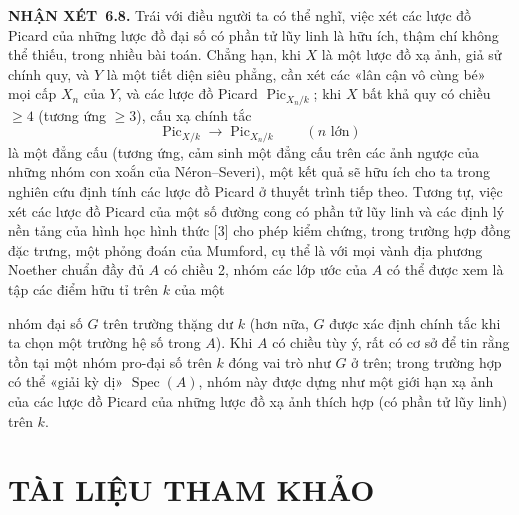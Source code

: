 \documentclass[11pt,twoside,openany]{book}
\numberwithin{equation}{section}
\newcommand{\src}[1]{%
  \phantomsection\hypertarget{src:\fgasourceid:#1}{}%
  \marginpar{\raggedleft\footnotesize\sffamily #1}%
}
\newcommand{\fgasourceid}{unset}
\newcommand{\result}[2]{\par\medskip\noindent\textbf{#1\if\relax\detokenize{#2}\relax\else\ #2\fi.}\quad}
\begin{document}
\result{NHẬN XÉT}{6.8} Trái với điều người ta có thể nghĩ, việc xét các lược đồ
Picard của những lược đồ đại số có phần tử lũy linh là hữu ích, thậm chí không
thể thiếu, trong nhiều bài toán. Chẳng hạn, khi $X$ là một lược đồ xạ ảnh, giả
sử chính quy, và $Y$ là một tiết diện siêu phẳng, cần xét các «lân cận vô cùng
bé» mọi cấp $X_n$ của $Y$, và các lược đồ Picard
$\operatorname{Pic}_{X_n/k}$; khi $X$ bất khả quy có chiều $\geq4$ (tương ứng
$\geq3$), cấu xạ chính tắc
\[
\operatorname{Pic}_{X/k}\longrightarrow\operatorname{Pic}_{X_n/k}
\qquad(n\text{ lớn})
\]
là một đẳng cấu (tương ứng, cảm sinh một đẳng cấu trên các ảnh ngược của những
nhóm con xoắn của Néron--Severi), một kết quả sẽ hữu ích cho ta trong nghiên
cứu định tính các lược đồ Picard ở thuyết trình tiếp theo. Tương tự, việc xét
các lược đồ Picard của một số đường cong có phần tử lũy linh và các định lý nền
tảng của hình học hình thức [3] cho phép kiểm chứng, trong trường hợp đồng đặc
trưng, một phỏng đoán của Mumford, cụ thể là với mọi vành địa phương Noether
chuẩn đầy đủ $A$ có chiều 2, nhóm các lớp ước của $A$ có thể được xem là tập
các điểm hữu tỉ trên $k$ của một
\src{161}
nhóm đại số $G$ trên trường thặng dư $k$ (hơn nữa, $G$ được xác định chính tắc
khi ta chọn một trường hệ số trong $A$). Khi $A$ có chiều tùy ý, rất có cơ sở
để tin rằng tồn tại một nhóm pro-đại số trên $k$ đóng vai trò như $G$ ở trên;
trong trường hợp có thể «giải kỳ dị» $\operatorname{Spec}(A)$, nhóm này được
dựng như một giới hạn xạ ảnh của các lược đồ Picard của những lược đồ xạ ảnh
thích hợp (có phần tử lũy linh) trên $k$.

\section*{TÀI LIỆU THAM KHẢO}
\end{document}
